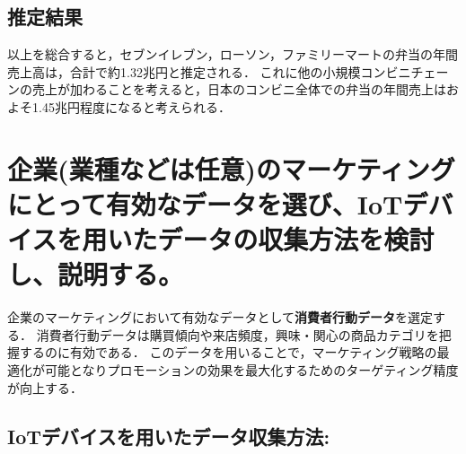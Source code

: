 \documentclass[titlepage,a4paper]{jsarticle}
\begin{document}
\subsection{推定結果}
以上を総合すると，セブンイレブン，ローソン，ファミリーマートの弁当の年間売上高は，合計で約1.32兆円と推定される．
これに他の小規模コンビニチェーンの売上が加わることを考えると，日本のコンビニ全体での弁当の年間売上はおよそ1.45兆円程度になると考えられる．

\section{企業(業種などは任意)のマーケティングにとって有効なデータを選び、IoTデバイスを用いたデータの収集方法を検討し、説明する。}
企業のマーケティングにおいて有効なデータとして\textbf{消費者行動データ}を選定する．
消費者行動データは購買傾向や来店頻度，興味・関心の商品カテゴリを把握するのに有効である．
このデータを用いることで，マーケティング戦略の最適化が可能となりプロモーションの効果を最大化するためのターゲティング精度が向上する．

\subsection*{IoTデバイスを用いたデータ収集方法:}%


\end{document}
